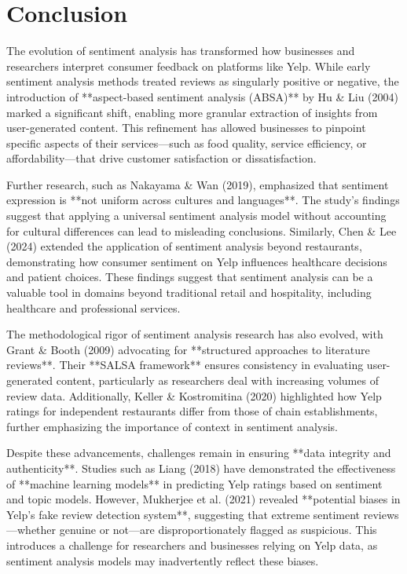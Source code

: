 \documentclass{article}
\begin{document}
\section{Conclusion}

The evolution of sentiment analysis has transformed how businesses and researchers interpret consumer feedback on platforms like Yelp. While early sentiment analysis methods treated reviews as singularly positive or negative, the introduction of **aspect-based sentiment analysis (ABSA)** by Hu \& Liu (2004)\cite{HuLiu2004} marked a significant shift, enabling more granular extraction of insights from user-generated content. This refinement has allowed businesses to pinpoint specific aspects of their services—such as food quality, service efficiency, or affordability—that drive customer satisfaction or dissatisfaction.

Further research, such as Nakayama \& Wan (2019)\cite{NakayamaWan2019}, emphasized that sentiment expression is **not uniform across cultures and languages**. The study’s findings suggest that applying a universal sentiment analysis model without accounting for cultural differences can lead to misleading conclusions. Similarly, Chen \& Lee (2024)\cite{ChenLee2024UPRa} extended the application of sentiment analysis beyond restaurants, demonstrating how consumer sentiment on Yelp influences healthcare decisions and patient choices. These findings suggest that sentiment analysis can be a valuable tool in domains beyond traditional retail and hospitality, including healthcare and professional services.

The methodological rigor of sentiment analysis research has also evolved, with Grant \& Booth (2009)\cite{GrantBooth2009} advocating for **structured approaches to literature reviews**. Their **SALSA framework** ensures consistency in evaluating user-generated content, particularly as researchers deal with increasing volumes of review data. Additionally, Keller \& Kostromitina (2020) \cite{KellerKostromitina2020} highlighted how Yelp ratings for independent restaurants differ from those of chain establishments, further emphasizing the importance of context in sentiment analysis.

Despite these advancements, challenges remain in ensuring **data integrity and authenticity**. Studies such as Liang (2018)\cite{Liang2018} have demonstrated the effectiveness of **machine learning models** in predicting Yelp ratings based on sentiment and topic models. However, Mukherjee et al. (2021)\cite{Mukherjee2021} revealed **potential biases in Yelp’s fake review detection system**, suggesting that extreme sentiment reviews—whether genuine or not—are disproportionately flagged as suspicious. This introduces a challenge for researchers and businesses relying on Yelp data, as sentiment analysis models may inadvertently reflect these biases.
\end{document}
